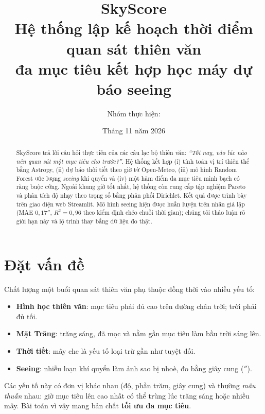 \documentclass[12pt,a4paper]{article}
\title{\textbf{SkyScore}\\[4pt]
\large Hệ thống lập kế hoạch thời điểm quan sát thiên văn\\
đa mục tiêu kết hợp học máy dự báo seeing}
\author{Nhóm thực hiện: \underline{\hspace{6cm}}}
\date{Tháng 11 năm 2026}
\newcommand{\arcsec}{\ensuremath{''}}
\begin{document}
\maketitle

\begin{abstract}
\noindent
SkyScore trả lời câu hỏi thực tiễn của các câu lạc bộ thiên văn: \emph{``Tối nay, vào lúc nào
nên quan sát một mục tiêu cho trước?''}. Hệ thống kết hợp (i) tính toán vị trí thiên thể bằng
Astropy, (ii) dự báo thời tiết theo giờ từ Open-Meteo, (iii) mô hình Random Forest ước lượng
\emph{seeing} khí quyển và (iv) một hàm điểm đa mục tiêu minh bạch có ràng buộc cứng. Ngoài
khung giờ tốt nhất, hệ thống còn cung cấp tập nghiệm Pareto và phân tích độ nhạy theo trọng số
bằng phân phối Dirichlet. Kết quả được trình bày trên giao diện web Streamlit. Mô hình seeing
hiện được huấn luyện trên nhãn giả lập (MAE $0{,}17\arcsec$, $R^2 = 0{,}96$ theo kiểm định
chéo chuỗi thời gian); chúng tôi thảo luận rõ giới hạn này và lộ trình thay bằng dữ liệu đo thật.
\end{abstract}

\tableofcontents
\newpage

\section{Đặt vấn đề}

Chất lượng một buổi quan sát thiên văn phụ thuộc đồng thời vào nhiều yếu tố:
\begin{itemize}[nosep]
  \item \textbf{Hình học thiên văn}: mục tiêu phải đủ cao trên đường chân trời; trời phải đủ tối.
  \item \textbf{Mặt Trăng}: trăng sáng, đã mọc và nằm gần mục tiêu làm bầu trời sáng lên.
  \item \textbf{Thời tiết}: mây che là yếu tố loại trừ gần như tuyệt đối.
  \item \textbf{Seeing}: nhiễu loạn khí quyển làm ảnh sao bị nhoè, đo bằng giây cung (\arcsec).
\end{itemize}
Các yếu tố này có đơn vị khác nhau (độ, phần trăm, giây cung) và thường \emph{mâu thuẫn}
nhau: giờ mục tiêu lên cao nhất có thể trùng lúc trăng sáng hoặc nhiều mây. Bài toán vì vậy
mang bản chất \textbf{tối ưu đa mục tiêu}.
\end{document}
